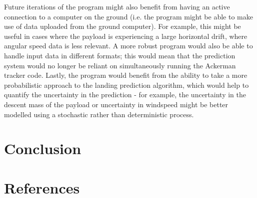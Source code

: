 \documentclass[11pt]{article}
\begin{document}
Future iterations of the program might also benefit from having an active connection to a computer on the ground (i.e. the program might be able to make use of data uploaded from the ground computer). For example, this might be useful in cases where the payload is experiencing a large horizontal drift, where angular speed data is less relevant. A more robust program would also be able to handle input data in different formats; this would mean that the prediction system would no longer be reliant on simultaneously running the Ackerman tracker code. Lastly, the program would benefit from the ability to take a more probabilistic approach to the landing prediction algorithm, which would help to quantify the uncertainty in the prediction - for example, the uncertainty in the descent mass of the payload or uncertainty in windspeed might be better modelled using a stochastic rather than deterministic process.

\section{Conclusion}

\section{References}
\end{document}
